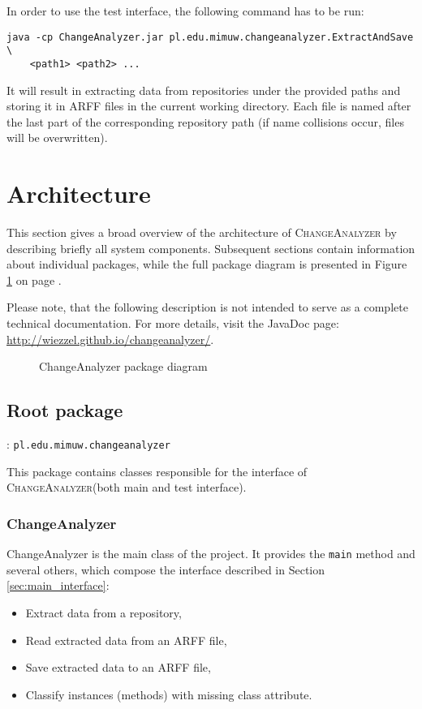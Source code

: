 \documentclass{pracamgr}
\newcommand{\ca}{\textsc{ChangeAnalyzer}\xspace}
\newcommand{\pack}[3]{\subsection{#1 package} \label{sec:#2} \underline{\smash{Full package name}}: \texttt{#3}\medskip}
\begin{document}
In order to use the test interface, the following command has to be run:

\begin{verbatim}
java -cp ChangeAnalyzer.jar pl.edu.mimuw.changeanalyzer.ExtractAndSave \
    <path1> <path2> ...
\end{verbatim}

It will result in extracting data from repositories under the provided paths and storing it in ARFF files in the current working directory. Each file is named after the last part of the corresponding repository path (if name collisions occur, files will be overwritten).

\section{Architecture}
\label{sec:architecture}
This section gives a broad overview of the architecture of \ca by describing briefly all system components. Subsequent sections contain information about individual packages, while the full package diagram is presented in Figure \ref{fig:package_diagram} on page \pageref{fig:package_diagram}.

Please note, that the following description is not intended to serve as a complete technical documentation. For more details, visit the JavaDoc page: \url{http://wiezzel.github.io/changeanalyzer/}.

\begin{figure}[h!]
\centering

\caption{ChangeAnalyzer package diagram}
\label{fig:package_diagram}
\end{figure}

\pack{Root}{root}{pl.edu.mimuw.changeanalyzer}

\noindent This package contains classes responsible for the interface of \ca (both main and test interface).

\subsubsection*{ChangeAnalyzer}
ChangeAnalyzer is the main class of the project. It provides the \texttt{main} method and several others, which compose the interface described in Section \ref{sec:main_interface}:
\begin{itemize}[noitemsep,topsep=1pt]
	\item Extract data from a repository,
    \item Read extracted data from an ARFF file,
    \item Save extracted data to an ARFF file,
    \item Classify instances (methods) with missing class attribute.
\end{itemize}
\end{document}
